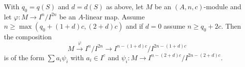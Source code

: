 %
\begin{lemma}
\label{lemma-factor-hom}
With $q_0 = q(S)$ and $d = d(S)$ as above, let $M$ be an $(A, n, c)$-module
and let $\varphi : M \to I^n/I^{2n}$ be an $A$-linear map. Assume
$n \geq \max(q_0 + (1 + d)c, (2 + d)c)$ and if $d = 0$ assume
$n \geq q_0 + 2c$. Then the composition
$$
M \xrightarrow{\varphi} I^n/I^{2n} \to
I^{n - (1 + d)c}/I^{2n - (1 + d)c}
$$
is of the form $\sum a_i \psi_i$ with $a_i \in I^c$ and
$\psi_i : M \to I^{n - (2 + d)c}/I^{2n - (2 + d)c}$.
\end{lemma}


